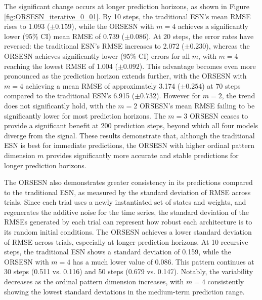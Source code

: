The significant change occurs at longer prediction horizons, as shown in Figure \ref{fig:ORSESN_iterative_0_01}. By 10 steps, the traditional ESN's mean RMSE rises to 1.093 ($\pm 0.159$), while the ORSESN with $m=4$ achieves a significantly lower (95\% CI) mean RMSE of 0.739 ($\pm 0.086$).
At 20 steps, the error rates have reversed: the traditional ESN's RMSE increases to 2.072 ($\pm 0.230$), whereas the ORSESN achieves significantly lower (95\% CI) errors for all $m$, with $m=4$ reaching the lowest RMSE of 1.004 ($\pm 0.092$). This advantage becomes even more pronounced as the prediction horizon extends further, with the ORSESN with $m=4$ achieving a mean RMSE of approximately 3.174 ($\pm 0.254$) at 70 steps compared to the traditional ESN's 6.915 ($\pm 0.732$). However for $m=2$, the trend does not significantly hold, with the $m=2$ ORSESN's mean RMSE failing to be significantly lower for most prediction horizons. The $m=3$ ORSESN ceases to provide a significant benefit at 200 prediction steps, beyond which all four models diverge from the signal.
These results demonstrate that, although the traditional ESN is best for immediate predictions, the ORSESN with higher ordinal pattern dimension $m$ provides significantly more accurate and stable predictions for longer prediction horizons.

The ORSESN also demonstrates greater consistency in its predictions compared to the traditional ESN, as measured by the standard deviation of RMSE across trials. Since each trial uses a newly instantiated set of states and weights, and regenerates the additive noise for the time series, the standard deviation of the RMSEs generated by each trial can represent how robust each architecture is to its random initial conditions. The ORSESN achieves a lower standard deviation of RMSE across trials, especially at longer prediction horizons. At 10 recursive steps, the traditional ESN shows a standard deviation of 0.159, while the ORSESN with $m=4$ has a much lower value of 0.086. This pattern continues at 30 steps (0.511 vs. 0.116) and 50 steps (0.679 vs. 0.147). Notably, the variability decreases as the ordinal pattern dimension increases, with $m=4$ consistently showing the lowest standard deviations in the medium-term prediction range.

